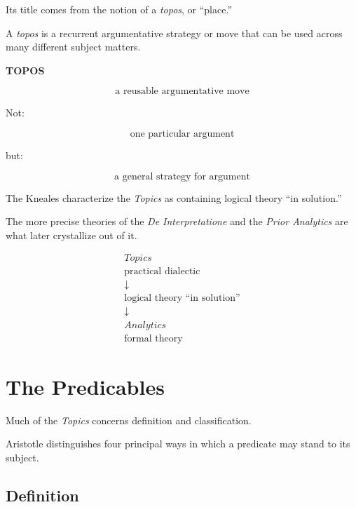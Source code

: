 \documentclass[11pt]{article}
\begin{document}
Its title comes from the notion of a \textit{topos}, or
``place.''

A \textit{topos} is a recurrent argumentative strategy or move
that can be used across many different subject matters.

\newpage

\begin{whiteboard}
\textbf{TOPOS}

\[
\boxed{\text{a reusable argumentative move}}
\]

Not:

\[
\text{one particular argument}
\]

but:

\[
\text{a general strategy for argument}
\]
\end{whiteboard}

The Kneales characterize the \textit{Topics} as containing logical
theory ``in solution.''

The more precise theories of the \textit{De Interpretatione} and
the \textit{Prior Analytics} are what later crystallize out of it.

\begin{whiteboard}
\[
\begin{array}{c}
\textit{Topics}\\
\text{practical dialectic}\\
\downarrow\\
\text{logical theory ``in solution''}\\
\downarrow\\
\textit{Analytics}\\
\text{formal theory}
\end{array}
\]
\end{whiteboard}

\section{The Predicables}

Much of the \textit{Topics} concerns definition and
classification.

Aristotle distinguishes four principal ways in which a predicate
may stand to its subject.

\subsection{Definition}
\end{document}
